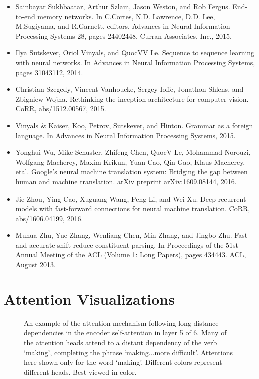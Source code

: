 \documentclass[11pt,a4paper]{article}
\begin{document}
\begin{itemize}
\item [sukhbaatar2015] Sainbayar Sukhbaatar, Arthur Szlam, Jason Weston, and Rob Fergus. End-to-end memory networks. In C.Cortes, N.D. Lawrence, D.D. Lee, M.Sugiyama, and R.Garnett, editors, Advances in Neural Information Processing Systems 28, pages 24402448. Curran Associates, Inc., 2015.
\item [sutskever14] Ilya Sutskever, Oriol Vinyals, and QuocVV Le. Sequence to sequence learning with neural networks. In Advances in Neural Information Processing Systems, pages 31043112, 2014.
\item [DBLP:journals/corr/SzegedyVISW15] Christian Szegedy, Vincent Vanhoucke, Sergey Ioffe, Jonathon Shlens, and Zbigniew Wojna. Rethinking the inception architecture for computer vision. CoRR, abs/1512.00567, 2015.
\item [KVparse15] Vinyals \& Kaiser, Koo, Petrov, Sutskever, and Hinton. Grammar as a foreign language. In Advances in Neural Information Processing Systems, 2015.
\item [wu2016google] Yonghui Wu, Mike Schuster, Zhifeng Chen, QuocV Le, Mohammad Norouzi, Wolfgang Macherey, Maxim Krikun, Yuan Cao, Qin Gao, Klaus Macherey, etal. Google's neural machine translation system: Bridging the gap between human and machine translation. arXiv preprint arXiv:1609.08144, 2016.
\item [DBLP:journals/corr/ZhouCWLX16] Jie Zhou, Ying Cao, Xuguang Wang, Peng Li, and Wei Xu. Deep recurrent models with fast-forward connections for neural machine translation. CoRR, abs/1606.04199, 2016.
\item [zhu-EtAl:2013:ACL] Muhua Zhu, Yue Zhang, Wenliang Chen, Min Zhang, and Jingbo Zhu. Fast and accurate shift-reduce constituent parsing. In Proceedings of the 51st Annual Meeting of the ACL (Volume 1: Long Papers), pages 434443. ACL, August 2013.
\end{itemize}

\section{Attention Visualizations}

\begin{figure}[h]
\caption{An example of the attention mechanism following long-distance dependencies in the encoder self-attention in layer 5 of 6. Many of the attention heads attend to a distant dependency of the verb `making', completing the phrase `making...more difficult'.  Attentions here shown only for the word `making'. Different colors represent different heads. Best viewed in color.}
\end{figure}
\end{document}
